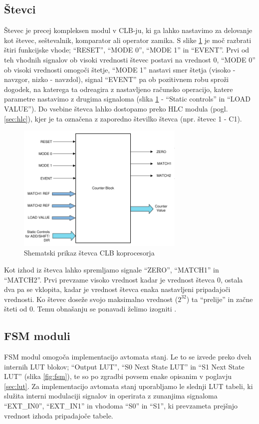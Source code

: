 \documentclass[a4paper]{article}
\begin{document}
\begin{sloppypar}
\subsection{Števci}
Števec je precej kompleksen modul v CLB-ju, ki ga lahko nastavimo za delovanje
kot števec, seštevalnik, komparator ali operator zamika. S slike
\ref{fig:stevec} je moč razbrati štiri funkcijske vhode; ``RESET'', ``MODE 0'',
``MODE 1'' in ``EVENT''. Prvi od teh vhodnih signalov ob visoki vrednosti
števec postavi na vrednost 0, ``MODE 0'' ob visoki vrednosti omogoči štetje,
``MODE 1'' nastavi smer štetja (visoko - navzgor, nizko - navzdol), signal
``EVENT'' pa ob pozitivnem robu sproži dogodek, na katerega ta odreagira z
nastavljeno računsko operacijo, katere parametre nastavimo z drugima signaloma
(slika \ref{fig:stevec} - ``Static controls'' in ``LOAD VALUE''). Do vsebine
števca lahko dostopamo preko HLC modula (pogl. \ref{sec:hlc}), kjer je ta
označena z zaporedno številko števca (npr. števec 1 - C1).

\begin{figure}[htb]
    \centerline{\includegraphics[width=8cm]{shema_stevec}}
    \caption{Shematski prikaz števca CLB koprocesorja
             \cite[Pogl.~26.4.2.1]{mcu-ref-manual}}
    \label{fig:stevec} 
\end{figure} 

Kot izhod iz števca lahko spremljamo signale ``ZERO'', ``MATCH1'' in
``MATCH2''. Prvi prevzame visoko vrednost kadar je vrednost števca 0, ostala
dva pa se vklopita, kadar je vrednost števca enaka nastavljeni pripadajoči
vrednosti. Ko števec doseže svojo maksimalno vrednost ($2^{32}$) ta ``prelije''
in začne šteti od 0. Temu obnašanju se ponavadi želimo izogniti
\cite[Pogl.~26.4.2]{mcu-ref-manual}.

\subsection{FSM moduli}
FSM modul omogoča implementacijo avtomata stanj. Le to se izvede preko dveh
internih LUT blokov; ``Output LUT'', ``S0 Next State LUT'' in ``S1 Next State
LUT'' (slika \ref{fig:fsm}), te so po zgradbi povsem enake opisanim v poglavju
\ref{sec:lut}. Za implementacijo avtomata stanj uporabljamo le slednji LUT
tabeli, ki služita interni modulaciji signalov in operirata z zunanjima
signaloma ``EXT\_IN0'', ``EXT\_IN1'' in vhodoma ``S0'' in ``S1'', ki prevzameta
prejšnjo vrednost izhoda pripadajoče tabele.


\end{sloppypar}
\end{document}
